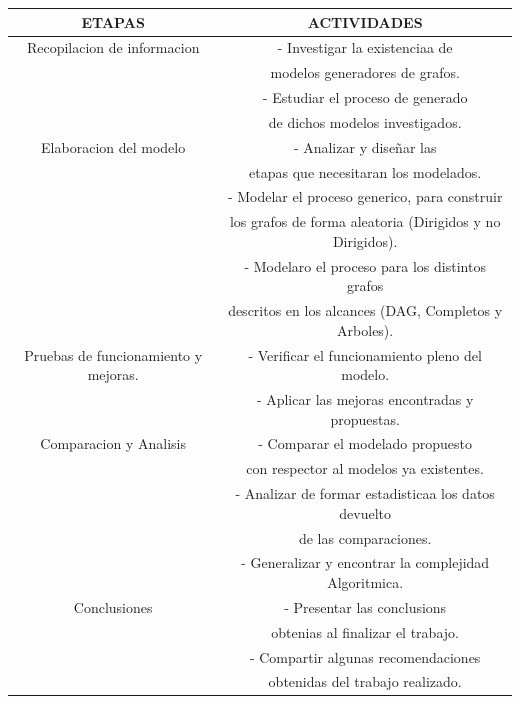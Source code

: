\documentclass[11pt]{extarticle}
\begin{document}
    \begin{center}
      \begin{tabular}{||c | c||} 
       \hline
       ETAPAS & ACTIVIDADES\\ [0.5ex] 
       \hline\hline
       Recopilacion de informacion &  - Investigar la existenciaa de \\ & modelos generadores de grafos.\\
        & - Estudiar el proceso de generado\\ & de dichos modelos investigados.\\
       \hline
       Elaboracion del modelo & - Analizar y diseñar las \\ & etapas que necesitaran los modelados.\\
        & - Modelar el proceso generico, para construir\\
        & los grafos de forma aleatoria (Dirigidos y no Dirigidos). \\
        & - Modelaro el proceso para los distintos grafos\\ 
        & descritos en los alcances (DAG, Completos y Arboles).\\
       \hline
       Pruebas de funcionamiento y mejoras.
        & - Verificar el funcionamiento pleno del modelo.\\
        & - Aplicar las mejoras encontradas y propuestas.\\
       \hline
       Comparacion y Analisis & - Comparar el modelado propuesto \\
        & con respector al modelos ya existentes. \\
        & - Analizar de formar estadisticaa los datos devuelto\\
        &  de las comparaciones.\\
        & - Generalizar y encontrar la complejidad Algoritmica.\\
       \hline
       Conclusiones & - Presentar las conclusions\\ & obtenias al finalizar el trabajo. \\ 
       & - Compartir algunas recomendaciones \\ & obtenidas del trabajo realizado.\\
       \hline
      \end{tabular}
    \end{center}
\end{document}
